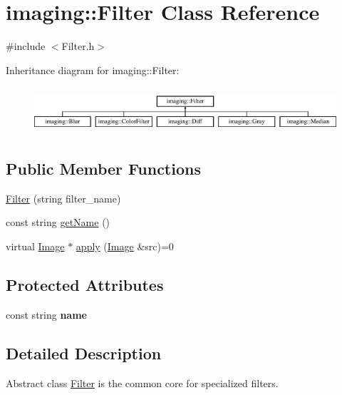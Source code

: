 \hypertarget{classimaging_1_1_filter}{}\section{imaging\+:\+:Filter Class Reference}
\label{classimaging_1_1_filter}


{\ttfamily \#include $<$Filter.\+h$>$}

Inheritance diagram for imaging\+:\+:Filter\+:\begin{figure}[H]
\begin{center}
\leavevmode
\includegraphics[height=1.736434cm]{classimaging_1_1_filter}
\end{center}
\end{figure}
\subsection*{Public Member Functions}
\begin{DoxyCompactItemize}
\item 
\hyperlink{classimaging_1_1_filter_a7ed3a34cf602ecd25b9671536a31f9b2}{Filter} (string filter\+\_\+name)
\item 
const string \hyperlink{classimaging_1_1_filter_a42614ff975ea370d98446ef34fb76538}{get\+Name} ()
\item 
virtual \hyperlink{classimaging_1_1_image}{Image} $\ast$ \hyperlink{classimaging_1_1_filter_ab153f2e4e89dd744806299a29da8289b}{apply} (\hyperlink{classimaging_1_1_image}{Image} \&src)=0
\end{DoxyCompactItemize}
\subsection*{Protected Attributes}
\begin{DoxyCompactItemize}
\item 
\mbox{\label{classimaging_1_1_filter_ad1c2254a57ea165175b343447b7bbb64}} 
const string {\bfseries name}
\end{DoxyCompactItemize}


\subsection{Detailed Description}
Abstract class \hyperlink{classimaging_1_1_filter}{Filter} is the common core for specialized filters. 

